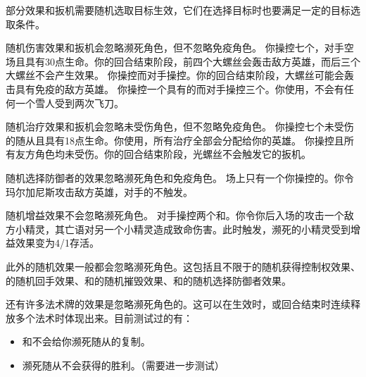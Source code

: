 部分效果和扳机需要随机选取目标生效，它们在选择目标时也要满足一定的目标选取条件。

随机伤害效果和扳机会忽略濒死角色，但不忽略免疫角色。
\example 你操控七个，对手空场且具有30点生命。你的回合结束阶段，前四个大螺丝会轰击敌方英雄，而后三个大螺丝不会产生效果。
\example 你操控而对手操控。你的回合结束阶段，大螺丝可能会轰击具有免疫的敌方英雄。
\example 你操控一个具有的而对手操控三个。你使用，不会有任何一个雪人受到两次飞刀。

随机治疗效果和扳机会忽略未受伤角色，但不忽略免疫角色。
\example 你操控七个未受伤的随从且具有18点生命。你使用，所有治疗全部会分配给你的英雄。
\example 你操控且所有友方角色均未受伤。你的回合结束阶段，光螺丝不会触发它的扳机。

随机选择防御者的效果忽略濒死角色和免疫角色。
\example 场上只有一个你操控的。你令玛尔加尼斯攻击敌方英雄，对手的不触发。

随机增益效果不会忽略濒死角色。
\example 对手操控两个和。你令你后入场的攻击一个敌方小精灵，其亡语对另一个小精灵造成致命伤害。此时触发，濒死的小精灵受到增益效果变为4/1存活。

此外的随机效果一般都会忽略濒死角色。这包括且不限于的随机获得控制权效果、的随机回手效果、和的随机摧毁效果、和的随机选择防御者效果。

还有许多法术牌的效果是忽略濒死角色的。这可以在生效时，或回合结束时连续释放多个法术时体现出来。目前测试过的有：
\begin{itemize}
    \item {}和不会给你濒死随从的复制。
    \item 濒死随从不会获得的胜利。（需要进一步测试）
\end{itemize}
